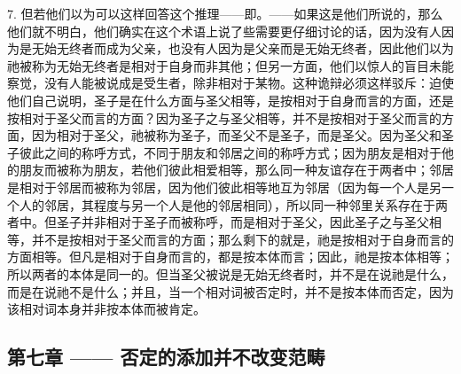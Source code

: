 7. 但若他们以为可以这样回答这个推理——即。——如果这是他们所说的，那么他们就不明白，他们确实在这个术语上说了些需要更仔细讨论的话，因为没有人因为是无始无终者而成为父亲，也没有人因为是父亲而是无始无终者，因此他们以为祂被称为无始无终者是相对于自身而非其他；但另一方面，他们以惊人的盲目未能察觉，没有人能被说成是受生者，除非相对于某物。这种诡辩必须这样驳斥：迫使他们自己说明，圣子是在什么方面与圣父相等，是按相对于自身而言的方面，还是按相对于圣父而言的方面？因为圣子之与圣父相等，并不是按相对于圣父而言的方面，因为相对于圣父，祂被称为圣子，而圣父不是圣子，而是圣父。因为圣父和圣子彼此之间的称呼方式，不同于朋友和邻居之间的称呼方式；因为朋友是相对于他的朋友而被称为朋友，若他们彼此相爱相等，那么同一种友谊存在于两者中；邻居是相对于邻居而被称为邻居，因为他们彼此相等地互为邻居（因为每一个人是另一个人的邻居，其程度与另一个人是他的邻居相同），所以同一种邻里关系存在于两者中。但圣子并非相对于圣子而被称呼，而是相对于圣父，因此圣子之与圣父相等，并不是按相对于圣父而言的方面；那么剩下的就是，祂是按相对于自身而言的方面相等。但凡是相对于自身而言的，都是按本体而言；因此，祂是按本体相等；所以两者的本体是同一的。但当圣父被说是无始无终者时，并不是在说祂是什么，而是在说祂不是什么；并且，当一个相对词被否定时，并不是按本体而否定，因为该相对词本身并非按本体而被肯定。\par


\subsection{第七章 —— 否定的添加并不改变范畴}

